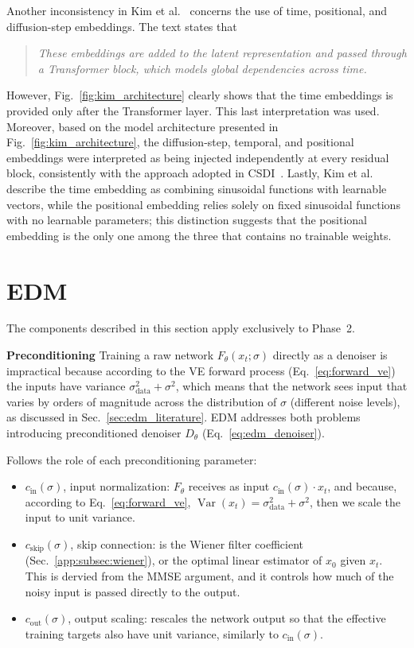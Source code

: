 Another inconsistency in Kim et al.\ \cite{kim2025diffusion} concerns the use of time, positional, and diffusion-step embeddings. The text states that
\begin{quote}
    \emph{These embeddings are added to the latent representation and passed through a Transformer block, which models global dependencies across time.}
\end{quote}
However, Fig.\ \ref{fig:kim_architecture} clearly shows that the time embeddings is provided only after the Transformer layer. This last interpretation was used. Moreover, based on the model architecture presented in Fig.\ \ref{fig:kim_architecture}, the diffusion-step, temporal, and positional embeddings were interpreted as being injected independently at every residual block, consistently with the approach adopted in CSDI\ \cite{tashiro2021csdi}. Lastly, Kim et al.\ \cite{kim2025diffusion} describe the time embedding as combining sinusoidal functions with learnable vectors, while the positional embedding relies solely on fixed sinusoidal functions with no learnable parameters; this distinction suggests that the positional embedding is the only one among the three that contains no trainable weights. 

\section{EDM}
The components described in this section apply exclusively to Phase~2.

\textbf{Preconditioning} \quad Training a raw network \(F_\theta (x_t;\sigma)\) directly as a denoiser is impractical because according to the VE forward process (Eq.\ \ref{eq:forward_ve}) the inputs have variance \(\sigma_{\text{data}}^2+\sigma^2\), which means that the network sees input that varies by orders of magnitude across the distribution of \(\sigma\) (different noise levels), as discussed in Sec.\ \ref{sec:edm_literature}. EDM addresses both problems introducing preconditioned denoiser \(D_\theta\) (Eq.\ \ref{eq:edm_denoiser}). 

Follows the role of each preconditioning parameter:
\begin{itemize}
    \item \(c_{\text{in}}(\sigma)\), input normalization: \(F_\theta\) receives as input \(c_{\text{in}}(\sigma)\cdot x_t\), and because, according to Eq.\ \ref{eq:forward_ve}, \(\operatorname{Var}(x_t)=\sigma_{\text{data}}^2+\sigma^2\), then we scale the input to unit variance.
    \item \(c_{\text{skip}}(\sigma)\), skip connection: is the Wiener filter coefficient (Sec.\ \ref{app:subsec:wiener}), or the optimal linear estimator of \(x_0\) given \(x_t\). This is dervied from the MMSE argument, and it controls how much of the noisy input is passed directly to the output.
    \item \(c_{\text{out}}(\sigma)\), output scaling: rescales the network output so that the effective training targets also have unit variance, similarly to \(c_{\text{in}}(\sigma)\).
\end{itemize}

